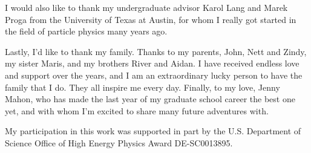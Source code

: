 I would also like to thank my undergraduate advisor Karol Lang and Marek Proga from the University of Texas at Austin, for whom I really got started in the field of particle physics many years ago.


Lastly, I'd like to thank my family. Thanks to my parents, John, Nett and Zindy, my sister Maris, and my brothers River and Aidan. I have received endless love and support over the years, and I am an extraordinary lucky person to have the family that I do. They all inspire me every day. Finally, to my love, Jenny Mahon, who has made the last year of my graduate school career the best one yet, and with whom I'm excited to share many future adventures with.


My participation in this work was supported in part by the U.S. Department of Science Office of High Energy Physics Award DE-SC0013895.
